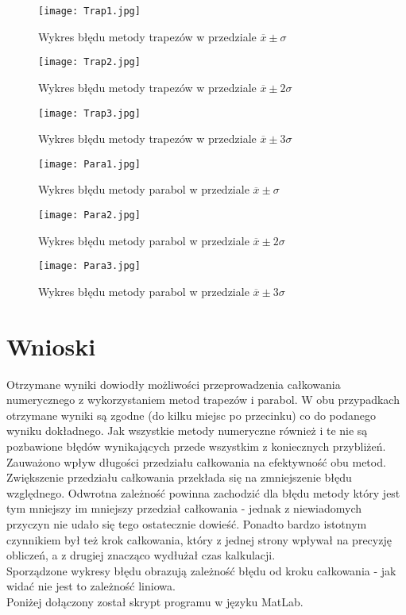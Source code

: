 \documentclass{article}
\begin{document}
\begin{figure}
	\centering
	 \texttt{[image: Trap1.jpg]} 
	\caption{Wykres błędu metody trapezów w przedziale $\overline{x}\pm\sigma$}
	\label{fig:Trap1.jpg}
\end{figure}
\begin{figure}
	\centering
	\texttt{[image: Trap2.jpg]} 
	\caption{Wykres błędu metody trapezów w przedziale $\overline{x}\pm2\sigma$}
	\label{fig:Trap2.jpg}
\end{figure}
	 \begin{figure}
	 	\centering
	  \texttt{[image: Trap3.jpg]} 
	 	\caption{Wykres błędu metody trapezów w przedziale $\overline{x}\pm3\sigma$}
	 	\label{fig:Trap2.jpg}
	 \end{figure}
	  \begin{figure}
	 	\centering
	 	\texttt{[image: Para1.jpg]} 
	 	\caption{Wykres błędu metody parabol w przedziale $\overline{x}\pm\sigma$}
	 	\label{fig:Para1.jpg}
	 \end{figure}
		  \begin{figure}
		\centering
	\texttt{[image: Para2.jpg]}
	\caption{Wykres błędu metody parabol w przedziale $\overline{x}\pm2\sigma$}
		\label{fig:Para2.jpg}
	\end{figure}
	
	 		  \begin{figure}
	 	\centering
	  \texttt{[image: Para3.jpg]}
	 	\caption{Wykres błędu metody parabol w przedziale $\overline{x}\pm3\sigma$}
	 	\label{fig:Para3.jpg}
	 \end{figure}
	 
	
	 
\newpage

	\section{Wnioski}
	Otrzymane wyniki dowiodły możliwości przeprowadzenia całkowania numerycznego z wykorzystaniem metod trapezów i parabol. W obu przypadkach otrzymane wyniki są zgodne (do kilku miejsc po przecinku) co do podanego wyniku dokładnego. Jak wszystkie metody numeryczne również i te nie są pozbawione błędów wynikających przede wszystkim z koniecznych przybliżeń.\\
	Zauważono wpływ długości przedziału całkowania na efektywność obu metod. Zwiększenie przedziału całkowania przekłada się na zmniejszenie błędu względnego. Odwrotna zależność powinna zachodzić dla błędu metody który jest tym mniejszy im mniejszy przedział całkowania - jednak z niewiadomych przyczyn nie udało się tego ostatecznie dowieść.  Ponadto bardzo istotnym czynnikiem był też krok całkowania, który z jednej strony wpływał na precyzję obliczeń, a z drugiej znacząco wydłużał czas kalkulacji.\\
	Sporządzone wykresy błędu  obrazują zależność błędu od kroku całkowania - jak widać nie jest to zależność liniowa.\\
	Poniżej dołączony został skrypt programu w języku MatLab.
\end{document}
